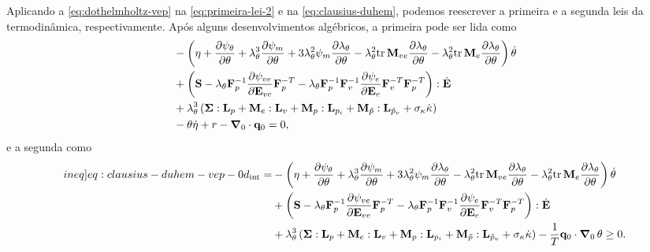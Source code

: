 \documentclass[Tese.tex]{subfiles}
\begin{document}
Aplicando a \cref{eq:dothelmholtz-vep} na \cref{eq:primeira-lei-2} e na \cref{eq:clausius-duhem}, podemos reescrever a primeira e a segunda leis da termodinâmica, respectivamente. Após alguns desenvolvimentos algébricos, a primeira pode ser lida como
\begin{equation}
\begin{aligned}\label{eq:primeira-lei-vep-0}
&- \left(\eta + \dfrac{\partial \psi_{\theta}}{\partial \theta} + \lambda_{\theta}^3\dfrac{\partial \psi_m}{\partial \theta} + 3\lambda_{\theta}^2\psi_m\dfrac{\partial \lambda_{\theta}}{\partial \theta} - \lambda_{\theta}^{2}\text{tr}\,\mathbf{M}_{ve}\dfrac{\partial \lambda_{\theta}}{\partial \theta}  - \lambda_{\theta}^{2}\text{tr}\,\mathbf{M}_e\dfrac{\partial \lambda_{\theta}}{\partial \theta}\right)\dot{\theta} \\& +\left(\mathbf{S} - \lambda_{\theta}\mathbf{F}_p^{-1}\dfrac{\partial \psi_{ve}}{\partial \mathbf{E}_{ve}}\mathbf{F}_p^{-T} - \lambda_{\theta}\mathbf{F}_p^{-1}\mathbf{F}_v^{-1}\dfrac{\partial \psi_e}{\partial \mathbf{E}_e}\mathbf{F}_v^{-T}\mathbf{F}_p^{-T}\right):\dot{\mathbf{E}} \\& + \lambda_{\theta}^3\left( \boldsymbol{\Sigma}:\mathbf{L}_p + \mathbf{M}_e:\mathbf{L}_v + \mathbf{M}_p:\mathbf{L}_{p_i} + \mathbf{M}_{\tilde{p}}:\mathbf{L}_{\tilde{p}_v} + \sigma_{\kappa}\dot{\kappa}\right) \\& - \theta \dot{\eta} + r - \boldsymbol{\nabla}_0\cdot\mathbf{q}_0 = 0, 
\end{aligned}
\end{equation}
e a segunda como
\begin{equation}
\begin{aligned} \label[ineq]{eq:clausius-duhem-vep-0}
\dissipation = &- \left(\entropy + \dfrac{\partial \helmholtzt}{\partial \temp} + \alongTermico^3\dfrac{\partial \helmholtzm}{\partial \temp} + 3\alongTermico^2\helmholtzm\dfrac{\partial \alongTermico}{\partial \temp} - \alongTermico^{2}\tr\mandelve\dfrac{\partial \alongTermico}{\partial \temp}  - \alongTermico^{2}\tr\mandele\dfrac{\partial \alongTermico}{\partial \temp}\right)\dottemp \\ & +\left(\S - \alongTermico\Fp^{-1}\dfrac{\partial \helmholtzve}{\partial \Eve}\Fp^{-T} - \alongTermico\Fp^{-1}\Fv^{-1}\dfrac{\partial \helmholtze}{\partial \Ee}\Fv^{-T}\Fp^{-T}\right):\dotE \\& + \alongTermico^3\left( \relativeStress:\Lp + \mandele:\Lv + \mandelpe:\Lpi + \mandelpve:\Lpvi + \yieldStress\dotencruamento\right) - \dfrac{1}{T}\qi\cdot\gradientei\,\temp \geq 0. 
\end{aligned}
\end{equation}
\end{document}
